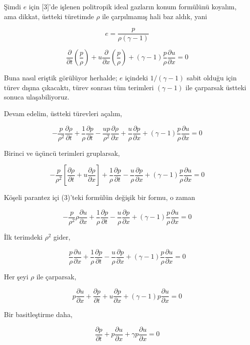 \documentclass[12pt,fleqn]{article}\usepackage{../../common}
\begin{document}
Şimdi $e$ için [3]'de işlenen politropik ideal gazların konum formülünü koyalım,
ama dikkat, üstteki türetimde $\rho$ ile çarpılmamış hali baz aldık, yani

$$
e = \frac{p}{\rho (\gamma - 1)}
$$

$$
\frac{\partial }{\partial t} \left(\frac{p}{\rho}\right) +
u \frac{\partial }{\partial x} \left(\frac{p}{\rho} \right) +
(\gamma - 1)\frac{p}{\rho} \frac{\partial u}{\partial x} = 0
$$

Buna nasıl eriştik görülüyor herhalde; $e$ içindeki $1/(\gamma-1)$ sabit
olduğu için türev dışına çıkacaktı, türev sonrası tüm terimleri $(\gamma-1)$
ile çarparsak üstteki sonuca ulaşabiliyoruz.

Devam edelim, üstteki türevleri açalım,

$$
-\frac{p}{\rho^2} \frac{\partial \rho}{\partial t} +
\frac{1}{\rho} \frac{\partial p}{\partial t} -
\frac{up}{\rho^2} \frac{\partial \rho}{\partial x} +
\frac{u}{\rho} \frac{\partial p}{\partial x} +
(\gamma - 1)\frac{p}{\rho} \frac{\partial u}{\partial x} = 0
$$

Birinci ve üçüncü terimleri gruplarsak,

$$
-\frac{p}{\rho^2}
\left[
  \frac{\partial \rho}{\partial t} + u \frac{\partial \rho}{\partial x}
\right] +
\frac{1}{\rho} \frac{\partial p}{\partial t} -
\frac{u}{\rho} \frac{\partial p}{\partial x} +
(\gamma - 1)\frac{p}{\rho} \frac{\partial u}{\partial x} = 0
$$

Köşeli parantez içi (3)'teki formülün değişik bir formu, o zaman

$$
-\frac{p}{\rho^2} \rho \frac{\partial u}{\partial x} +
\frac{1}{\rho} \frac{\partial p}{\partial t} -
\frac{u}{\rho} \frac{\partial p}{\partial x} +
(\gamma - 1)\frac{p}{\rho} \frac{\partial u}{\partial x} = 0
$$

İlk terimdeki $\rho^2$ gider,

$$
\frac{p}{\rho} \frac{\partial u}{\partial x} +
\frac{1}{\rho} \frac{\partial p}{\partial t} -
\frac{u}{\rho} \frac{\partial p}{\partial x} +
(\gamma - 1)\frac{p}{\rho} \frac{\partial u}{\partial x} = 0
$$

Her şeyi $\rho$ ile çarparsak,

$$
p \frac{\partial u}{\partial x} +
\frac{\partial p}{\partial t} +
u \frac{\partial p}{\partial x} +
(\gamma - 1)p \frac{\partial u}{\partial x} = 0
$$

Bir basitleştirme daha,

$$
\frac{\partial p}{\partial t} +
p \frac{\partial u}{\partial x} +
\gamma p \frac{\partial u}{\partial x} = 0
$$
\end{document}
